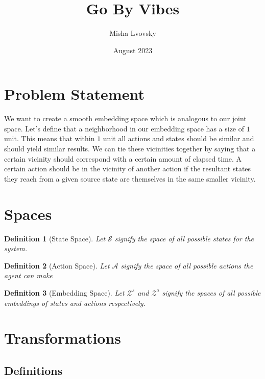 \documentclass{article}
\title{Go By Vibes}
\author{Misha Lvovsky}
\date{August 2023}
\newtheorem{definition}{Definition}
\begin{document}
\maketitle

\section{Problem Statement}

We want to create a smooth embedding space which is analogous to our joint space.
Let's define that a neighborhood in our embedding space has a size of $1$ unit. This means that within $1$ unit all actions and states should be similar and should yield similar results. We can tie these vicinities together by saying that a certain vicinity should correspond with a certain amount of elapsed time. A certain action should be in the vicinity of another action if the resultant states they reach from a given source state are themselves in the same smaller vicinity.

\section{Spaces}

\begin{definition} [State Space]
Let $\mathcal{S}$ signify the space of all possible states for the system.
\end{definition}
\begin{definition} [Action Space]
    Let $\mathcal{A}$ signify the space of all possible actions the agent can make
\end{definition}
\begin{definition} [Embedding Space]
Let $\mathcal{Z}^s$ and $\mathcal{Z}^a$ signify the spaces of all possible embeddings of states and actions respectively.
\end{definition}


\section{Transformations}

\subsection*{Definitions}
\end{document}
